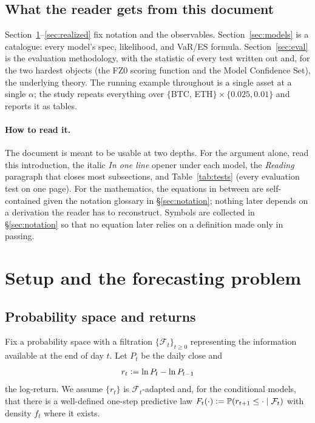\documentclass[11pt,a4paper]{article}
\newcommand{\Prob}{\mathbb{P}}
\newcommand{\Fcal}{\mathcal{F}}
\newcommand{\eqdef}{\mathrel{\vcentcolon=}}
\begin{document}
\subsection{What the reader gets from this document}

Section~\ref{sec:setup}--\ref{sec:realized} fix notation and the observables.
Section~\ref{sec:models} is a catalogue: every model's spec, likelihood, and
VaR/ES formula. Section~\ref{sec:eval} is the evaluation methodology, with the
statistic of every test written out and, for the two hardest objects (the FZ0
scoring function and the Model Confidence Set), the underlying theory. The
running example throughout is a single asset at a single $\alpha$; the study
repeats everything over $\{$BTC, ETH$\} \times \{0.025, 0.01\}$ and reports it as
tables.

\paragraph{How to read it.} The document is meant to be usable at two depths.
For the argument alone, read this introduction, the italic \emph{In one line}
opener under each model, the \emph{Reading} paragraph that closes most
subsections, and Table~\ref{tab:tests} (every evaluation test on one page). For
the mathematics, the equations in between are self-contained given the
notation glossary in \S\ref{sec:notation}; nothing later depends on a
derivation the reader has to reconstruct. Symbols are collected in
\S\ref{sec:notation} so that no equation later relies on a definition made only
in passing.

\section{Setup and the forecasting problem}\label{sec:setup}

\subsection{Probability space and returns}

Fix a probability space with a filtration $\{\Fcal_t\}_{t\ge0}$ representing the
information available at the end of day $t$. Let $P_t$ be the daily close and
\begin{equation}
  r_t \eqdef \ln P_t - \ln P_{t-1}
\end{equation}
the log-return. We assume $\{r_t\}$ is $\Fcal_t$-adapted and, for the
conditional models, that there is a well-defined one-step predictive law
$F_t(\cdot) \eqdef \Prob(r_{t+1}\le \cdot \mid \Fcal_t)$ with density $f_t$ where
it exists.
\end{document}

